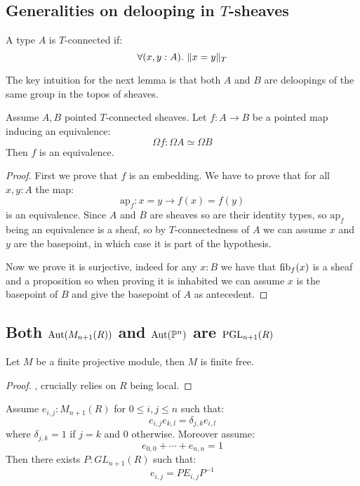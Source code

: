 \subsection{Generalities on delooping in $T$-sheaves}

\begin{definition}
A type $A$ is $T$-connected if:
\[\forall(x,y:A).\ \propTrunc{x=y}_T\]
\end{definition}

The key intuition for the next lemma is that both $A$ and $B$ are deloopings of the same group in the topos of sheaves.

\begin{lemma}\label{deloopings-equivalence}
Assume $A,B$ pointed $T$-connected sheaves. Let $f:A\to B$ be a pointed map inducing an equivalence:
\[\Omega f : \Omega A \simeq \Omega B\]
Then $f$ is an equivalence.
\end{lemma}

\begin{proof}
First we prove that $f$ is an embedding. We have to prove that for all $x,y:A$ the map:
\[\mathrm{ap}_f : x=y \to f(x)=f(y)\]
is an equivalence. Since $A$ and $B$ are sheaves so are their identity types, so $\mathrm{ap}_f$ being an equivalence is a sheaf, so by $T$-connectedness of $A$ we can assume $x$ and $y$ are the basepoint, in which case it is part of the hypothesis.

Now we prove it is surjective, indeed for any $x:B$ we have that $\mathrm{fib}_f(x)$ is a sheaf and a proposition so when proving it is inhabited we can assume $x$ is the basepoint of $B$ and give the basepoint of $A$ as antecedent.
\end{proof}


\subsection{Both $\mathrm{Aut}(M_{n+1}(R))$ and $\mathrm{Aut}(\mathbb{P}^n)$ are $\operatorname{PGL}_{n+1}(R)$}

\begin{lemma}\label{finite-projective-free}
Let $M$ be a finite projective module, then $M$ is finite free.
\end{lemma}

\begin{proof}
\cite{TODO}, crucially relies on $R$ being local.
\end{proof}

\begin{lemma}\label{fundamental-system-matrices}
Assume $e_{i,j}:M_{n+1}(R)$ for $0\leq i,j\leq n$ such that:
\[e_{i,j}e_{k,l} = \delta_{j,k}e_{i,l}\]
where $\delta_{j,k} = 1$ if $j=k$ and $0$ otherwise. Moreover assume:
\[e_{0,0}+\cdots+e_{n,n}=1\]
Then there exists $P:GL_{n+1}(R)$ such that:
\[e_{i,j} = PE_{i,j}P^{-1}\]
\end{lemma}


